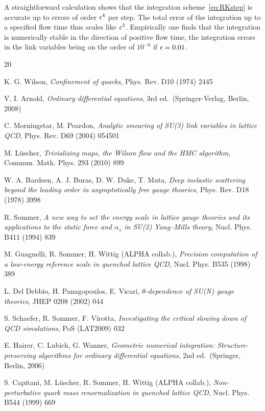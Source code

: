 A straightforward calculation
shows that the integration scheme~\eqref{eq:RKstep}
is accurate up to errors of order $\epsilon^4$ per step. The total
error of the integration up to a specified flow time thus scales
like $\epsilon^3$. Empirically one finds that
the integration is numerically stable in the
direction of positive flow time,
the integration errors in the link variables being
on the order of $10^{-6}$ if $\epsilon=0.01$.

\begin{thebibliography}{20}

K. G. Wilson, \textit{Confinement of quarks},
Phys. Rev. D10 (1974) 2445

V. I. Arnold,
\textit{Ordinary differential equations}, 3rd ed.\ (Springer-Verlag, Berlin, 2008)

C. Morningstar, M. Peardon,
\textit{Analytic smearing of SU(3) link variables in lattice QCD},
Phys. Rev. D69 (2004) 054501

M. L\"uscher,
\textit{Trivializing maps, the Wilson flow and the HMC algorithm},
Commun. Math. Phys. 293 (2010) 899

W. A. Bardeen, A. J. Buras, D. W. Duke, T. Muta,
\textit{Deep inelastic scattering beyond the leading order
in asymptotically free gauge theories},
Phys. Rev. D18 (1978) 3998

R. Sommer,
\textit{A new way to set the energy scale in lattice gauge theories
and its applications to the static force and $\alpha_s$ in
SU(2) Yang--Mills theory},
Nucl. Phys. B411 (1994) 839

M. Guagnelli, R. Sommer, H. Wittig (ALPHA collab.),
\textit{Precision computation of a low-energy reference scale in
quenched lattice QCD},
Nucl. Phys. B535 (1998) 389

L. Del Debbio, H. Panagopoulos, E. Vicari,
\textit{$\theta$-dependence of SU(N) gauge theories},
JHEP 0208 (2002) 044

S. Schaefer, R. Sommer, F. Virotta,
\textit{Investigating the critical slowing down of QCD simulations},
PoS (LAT2009) 032

E. Hairer, C. Lubich, G. Wanner,
\textit{Geometric numerical integration:
Structure-preserving algorithms for ordinary differential equations},
2nd ed.\ (Springer, Berlin, 2006)

S. Capitani, M. L\"uscher, R. Sommer, H. Wittig (ALPHA collab.),
\textit{Non-perturbative quark mass renormalization in quenched lattice QCD},
Nucl. Phys. B544 (1999) 669


\end{thebibliography}
